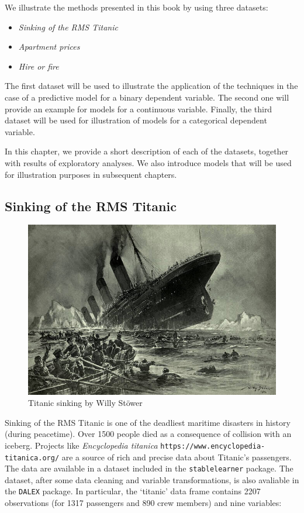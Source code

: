 \documentclass[12pt,]{krantz}
\providecommand{\tightlist}{%
  \setlength{\itemsep}{0pt}\setlength{\parskip}{0pt}}
\theoremstyle{definition}
\theoremstyle{definition}
\theoremstyle{definition}
\theoremstyle{remark}
\begin{document}
We illustrate the methods presented in this book by using three
datasets:

\begin{itemize}
\tightlist
\item
  \emph{Sinking of the RMS Titanic}
\item
  \emph{Apartment prices}
\item
  \emph{Hire or fire}
\end{itemize}

The first dataset will be used to illustrate the application of the
techniques in the case of a predictive model for a binary dependent
variable. The second one will provide an example for models for a
continuous variable. Finally, the third dataset will be used for
illustration of models for a categorical dependent variable.

In this chapter, we provide a short description of each of the datasets,
together with results of exploratory analyses. We also introduce models
that will be used for illustration purposes in subsequent chapters.

\hypertarget{TitanicDataset}{%
\subsection{Sinking of the RMS Titanic}\label{TitanicDataset}}

\begin{figure}
\centering
\includegraphics{figure/Titanic.jpg}
\caption{Titanic sinking by Willy Stöwer}
\end{figure}

Sinking of the RMS Titanic is one of the deadliest maritime disasters in
history (during peacetime). Over 1500 people died as a consequence of
collision with an iceberg. Projects like \emph{Encyclopedia titanica}
\texttt{https://www.encyclopedia-titanica.org/} are a source of rich and
precise data about Titanic's passengers. The data are available in a
dataset included in the \texttt{stablelearner} package. The dataset,
after some data cleaning and variable transformations, is also avaliable
in the \texttt{DALEX} package. In particular, the `titanic' data frame
contains 2207 observations (for 1317 passengers and 890 crew members)
and nine variables:
\end{document}
